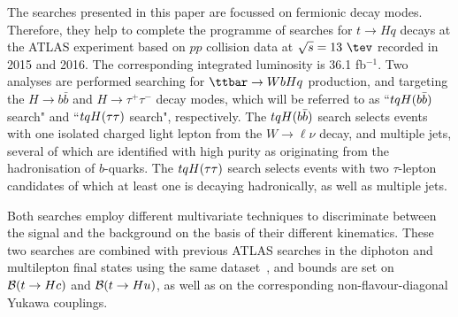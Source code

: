 
The searches presented in this paper are focussed on fermionic decay modes.
Therefore, they help to complete the programme of searches for $t \to Hq$ decays at the ATLAS experiment based on $pp$ collision 
data at $\sqrt{s}=13~\tev$ recorded in 2015 and 2016. The corresponding integrated luminosity is 36.1 fb$^{-1}$.
Two analyses are performed searching for $\ttbar \to WbHq$ production, and targeting the $H \to b\bar{b}$ and $H \to \tau^+\tau^-$ decay modes, 
which will be referred to as ``$tqH(b\bar{b})$ search" and ``$tqH(\tau\tau)$ search", respectively.
The $tqH(b\bar{b})$ search selects events with one isolated charged light lepton from the $W \to \ell\nu$ decay, and multiple jets, several 
of which are identified with high purity as originating from the hadronisation of $b$-quarks. 
The $tqH(\tau\tau)$ search selects events with two $\tau$-lepton candidates of which at least one is decaying hadronically, as well as multiple jets. 

Both searches employ different multivariate techniques to discriminate between the signal and the background on the basis of their different kinematics. 
These two searches are combined with previous ATLAS searches in the diphoton and multilepton final states using the same dataset~\cite{Aaboud:2017mfd,Aaboud:2018pob}, 
and bounds are set on $\mathcal{B}(t\to Hc)$ and $\mathcal{B}(t\to Hu)$, as well as on the corresponding non-flavour-diagonal Yukawa couplings. 






